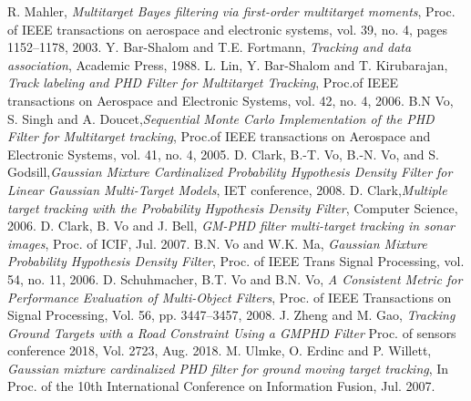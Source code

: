 \documentclass[10pt,french,a4paper]{report}
\begin{document}
  
 \begin{thebibliography}{9} 
 R. Mahler, \emph{Multitarget Bayes filtering via first-order multitarget moments}, Proc. of IEEE transactions on
aerospace and electronic systems, vol. 39, no. 4, pages 1152–1178, 2003.
Y. Bar-Shalom and T.E. Fortmann, \emph{Tracking and data association}, Academic Press, 1988.
L. Lin, Y. Bar-Shalom and T. Kirubarajan, \emph{Track labeling and {PHD} Filter for Multitarget Tracking}, Proc.of IEEE transactions on 
Aerospace and Electronic Systems, vol. 42, no. 4, 2006.
B.N Vo, S. Singh and A. Doucet,\emph{Sequential Monte Carlo Implementation of the {PHD} Filter for Multitarget tracking},
Proc.of IEEE transactions on Aerospace and Electronic Systems, vol. 41, no. 4, 2005. 
D. Clark, B.-T. Vo, B.-N. Vo, and S. Godsill,\emph{Gaussian Mixture Cardinalized Probability Hypothesis Density Filter for Linear Gaussian Multi-Target Models}, IET conference, 2008.
 D. Clark,\emph{Multiple target tracking with the Probability Hypothesis Density Filter}, Computer Science, 2006. 
 D. Clark, B. Vo and J. Bell, \emph{GM-PHD filter multi-target tracking in sonar images}, Proc. of ICIF, Jul. 2007.
B.N. Vo and W.K. Ma, \emph{Gaussian Mixture Probability Hypothesis Density Filter}, Proc. of IEEE Trans Signal Processing, vol. 54, no. 11, 2006.
D. Schuhmacher, B.T. Vo and B.N. Vo, \emph{A Consistent Metric for Performance Evaluation of Multi-Object Filters}, Proc. of IEEE Transactions on Signal Processing, Vol. 56, pp. 3447–3457, 2008.
J. Zheng and M. Gao, \emph{Tracking Ground Targets with a Road Constraint Using a GMPHD Filter}
Proc. of sensors conference 2018, Vol. 2723, Aug. 2018.  
M. Ulmke, O. Erdinc and P. Willett, \emph{Gaussian mixture cardinalized PHD filter for ground moving target tracking}, In
Proc. of the 10th International Conference on Information Fusion, Jul. 2007.

\end{thebibliography}
%
%	
\end{document}
